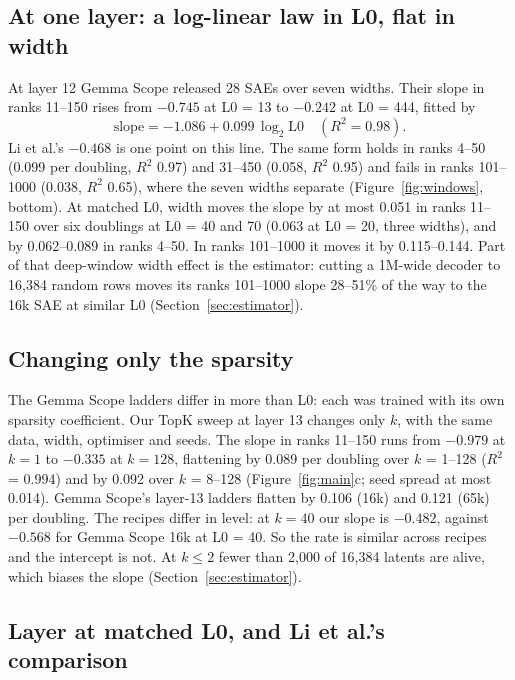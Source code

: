 \documentclass[10pt,twocolumn]{article}
\begin{document}
\subsection{At one layer: a log-linear law in L0, flat in width}

At layer 12 Gemma Scope released 28 SAEs over seven widths. Their slope in ranks 11--150 rises from $-0.745$ at L0 = 13 to $-0.242$ at L0 = 444, fitted by
\begin{equation}
\text{slope} = -1.086 + 0.099\,\log_2 \text{L0} \quad (R^2 = 0.98).
\label{eq:l12}
\end{equation}
Li et al.'s $-0.468$ is one point on this line. The same form holds in ranks 4--50 (0.099 per doubling, $R^2$ 0.97) and 31--450 (0.058, $R^2$ 0.95) and fails in ranks 101--1000 (0.038, $R^2$ 0.65), where the seven widths separate (Figure~\ref{fig:windows}, bottom). At matched L0, width moves the slope by at most 0.051 in ranks 11--150 over six doublings at L0 = 40 and 70 (0.063 at L0 = 20, three widths), and by 0.062--0.089 in ranks 4--50. In ranks 101--1000 it moves it by 0.115--0.144. Part of that deep-window width effect is the estimator: cutting a 1M-wide decoder to 16,384 random rows moves its ranks 101--1000 slope 28--51\% of the way to the 16k SAE at similar L0 (Section~\ref{sec:estimator}).

\subsection{Changing only the sparsity}

The Gemma Scope ladders differ in more than L0: each was trained with its own sparsity coefficient. Our TopK sweep at layer 13 changes only $k$, with the same data, width, optimiser and seeds. The slope in ranks 11--150 runs from $-0.979$ at $k = 1$ to $-0.335$ at $k = 128$, flattening by 0.089 per doubling over $k$ = 1--128 ($R^2$ = 0.994) and by 0.092 over $k$ = 8--128 (Figure~\ref{fig:main}c; seed spread at most 0.014). Gemma Scope's layer-13 ladders flatten by 0.106 (16k) and 0.121 (65k) per doubling. The recipes differ in level: at $k = 40$ our slope is $-0.482$, against $-0.568$ for Gemma Scope 16k at L0 = 40. So the rate is similar across recipes and the intercept is not. At $k \le 2$ fewer than 2,000 of 16,384 latents are alive, which biases the slope (Section~\ref{sec:estimator}).

\subsection{Layer at matched L0, and Li et al.'s comparison}
\end{document}
